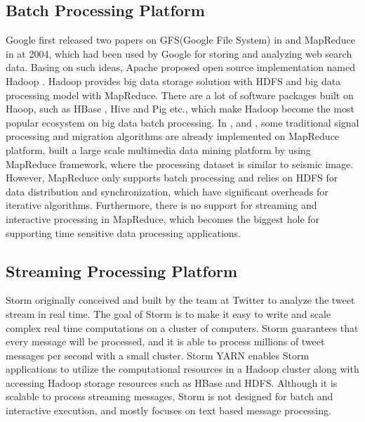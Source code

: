 \subsection{Batch Processing Platform}
Google first released two papers on GFS(Google File System) in \cite{GhemawatGFS945450} and MapReduce in \cite{DeanMSD1251264} at 2004, which had been used by Google for storing and analyzing web search data. Basing on such ideas, Apache proposed open source implementation named Hadoop \cite{ApacheHadoop}. Hadoop provides big data storage solution with HDFS and big data processing model with MapReduce. There are a lot of software packages built on Haoop, such as HBase \cite{ApacheHBase}, Hive \cite{ApacheHive} and Pig \cite{ApachePig} etc., which make Hadoop become the most popular ecosystem on big data batch processing. In \cite{2432874MohammadzaheriDISRAYMapReduce}, \cite{6118958RizvandiMapRecudePKTM} and \cite{2745578AddairSeismicSignalHadoop}, some traditional signal processing and migration algorithms are already implemented on MapReduce platform. \cite{6427595WangMultimediaMapReduce} built a large scale multimedia data mining platform by using MapReduce framework, where the processing dataset is similar to seismic image. However,  MapReduce only supports batch processing and relies on HDFS for data distribution and synchronization, which have significant overheads for iterative algorithms. Furthermore, there is no support for streaming and interactive processing in MapReduce, which becomes the biggest hole for supporting time sensitive data processing applications.

\subsection{Streaming Processing Platform}
Storm \cite{ApacheStorm} originally conceived and built by the team at Twitter to analyze the tweet stream in real time. The goal of Storm is to make it easy to write and scale complex real time computations on a cluster of computers. Storm guarantees that every message will be processed, and it is able to process millions of tweet messages per second with a small cluster. 
Storm YARN enables Storm applications to utilize the computational resources in a Hadoop cluster along with accessing Hadoop storage resources such as HBase \cite{ApacheHBase} and HDFS. Although it is scalable to process streaming messages, Storm is not designed for batch and interactive execution, and mostly focuses on text based message processing. 

